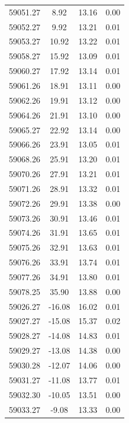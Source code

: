 \begin{longtable}{|c|c|c|c|}
 59051.27 &    8.92 &       13.16 &          0.00 \\
 59052.27 &    9.92 &       13.21 &          0.01 \\
 59053.27 &   10.92 &       13.22 &          0.01 \\
 59058.27 &   15.92 &       13.09 &          0.01 \\
 59060.27 &   17.92 &       13.14 &          0.01 \\
 59061.26 &   18.91 &       13.11 &          0.00 \\
 59062.26 &   19.91 &       13.12 &          0.00 \\
 59064.26 &   21.91 &       13.10 &          0.00 \\
 59065.27 &   22.92 &       13.14 &          0.00 \\
 59066.26 &   23.91 &       13.05 &          0.01 \\
 59068.26 &   25.91 &       13.20 &          0.01 \\
 59070.26 &   27.91 &       13.21 &          0.01 \\
 59071.26 &   28.91 &       13.32 &          0.01 \\
 59072.26 &   29.91 &       13.38 &          0.00 \\
 59073.26 &   30.91 &       13.46 &          0.01 \\
 59074.26 &   31.91 &       13.65 &          0.01 \\
 59075.26 &   32.91 &       13.63 &          0.01 \\
 59076.26 &   33.91 &       13.74 &          0.01 \\
 59077.26 &   34.91 &       13.80 &          0.01 \\
 59078.25 &   35.90 &       13.88 &          0.00 \\
 59026.27 &  -16.08 &       16.02 &          0.01 \\
 59027.27 &  -15.08 &       15.37 &          0.02 \\
 59028.27 &  -14.08 &       14.83 &          0.01 \\
 59029.27 &  -13.08 &       14.38 &          0.00 \\
 59030.28 &  -12.07 &       14.06 &          0.00 \\
 59031.27 &  -11.08 &       13.77 &          0.01 \\
 59032.30 &  -10.05 &       13.51 &          0.00 \\
 59033.27 &   -9.08 &       13.33 &          0.00 \\

\end{longtable}
